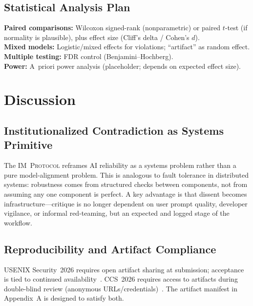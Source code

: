 \documentclass[11pt,a4paper]{article}
\newcommand{\protshort}{\textsc{IM~Protocol}}
\begin{document}
\subsection{Statistical Analysis Plan}
\textbf{Paired comparisons:} Wilcoxon signed-rank (nonparametric) or paired $t$-test (if normality is plausible), plus effect size (Cliff's delta / Cohen's $d$).\\
\textbf{Mixed models:} Logistic/mixed effects for violations; ``artifact'' as random effect.\\
\textbf{Multiple testing:} FDR control (Benjamini--Hochberg).\\
\textbf{Power:} A~priori power analysis (placeholder; depends on expected effect size).

\section{Discussion}

\subsection{Institutionalized Contradiction as Systems Primitive}
The \protshort{} reframes AI reliability as a systems problem rather than a pure model-alignment problem.
This is analogous to fault tolerance in distributed systems: robustness comes from structured checks between components, not from assuming any one component is perfect.
A key advantage is that dissent becomes infrastructure---critique is no longer dependent on user prompt quality, developer vigilance, or informal red-teaming, but an expected and logged stage of the workflow.

\subsection{Reproducibility and Artifact Compliance}
USENIX Security~2026 requires open artifact sharing at submission; acceptance is tied to continued availability~\cite{usenix_sec26_artifacts,usenix_sec26_cfp}.
CCS~2026 requires access to artifacts during double-blind review (anonymous URLs/credentials)~\cite{ccs_2026_cfp}.
The artifact manifest in Appendix~A is designed to satisfy both.
\end{document}
